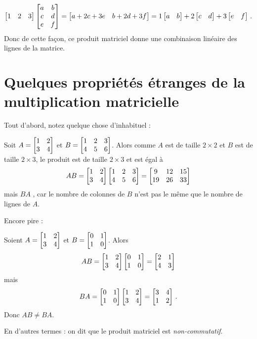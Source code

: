 \begin{myexample}
$$
\mat{1 & 2 & 3}\mat{a & b \\ c & d \\ e & f} = \mat{a+2c+3e & b+2d+3f} = 
1\mat{a & b} + 2\mat{c&d} + 3\mat{e&f}\,.
$$
Donc de cette façon, ce produit matriciel donne une combinaison linéaire des lignes de la matrice.
\end{myexample}


\section{Quelques propriétés étranges de la multiplication matricielle}

Tout d'abord, notez quelque chose d'inhabituel :

\begin{myexample} Soit $A = \mat{1 & 2 \\ 3& 4}$ et $B = \mat{1 & 2 & 3\\ 4&5&6}$.
Alors comme $A$ est de taille $2\times 2$ et $B$ est de taille $2\times 3$, le
produit est de taille $2\times 3$ et est égal à
$$
AB = \mat{1 & 2 \\ 3& 4}\mat{1 & 2 & 3\\ 4&5&6} = \mat{9 & 12 & 15\\ 19 & 26 & 33}
$$
mais $BA$ , car le nombre de colonnes de $B$
n'est pas le même que le nombre de lignes de $A$.
\end{myexample}


Encore pire :

\begin{myexample}
Soient $A = \mat{1 & 2 \\ 3& 4}$ et $B = \mat{0&1\\1&0}$.
Alors
$$
AB = \mat{1 & 2 \\ 3& 4}\mat{0&1\\1&0}=\mat{2&1\\ 4&3}
$$
mais 
$$
BA = \mat{0&1\\1&0}\mat{1 & 2 \\ 3& 4}=\mat{3&4\\1&2}\,.
$$
Donc $AB\neq BA$.
\end{myexample}


En d'autres termes : on dit que le produit matriciel est \emph{non-commutatif}.


